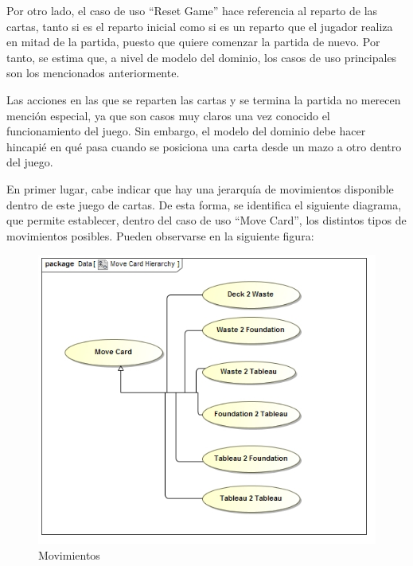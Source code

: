 \documentclass[11pt]{article}
\begin{document}
Por otro lado, el caso de uso ``Reset Game'' hace referencia al reparto de las cartas, tanto si es el reparto inicial como si es un reparto que el jugador realiza en mitad de la partida, puesto que quiere comenzar la partida de nuevo. Por tanto, se estima que, a nivel de modelo del dominio, los casos de uso principales son los mencionados anteriormente.

Las acciones en las que se reparten las cartas y se termina la partida no merecen mención especial, ya que son casos muy claros una vez conocido el funcionamiento del juego. Sin embargo, el modelo del dominio debe hacer hincapié en qué pasa cuando se posiciona una carta desde un mazo a otro dentro del juego.

En primer lugar, cabe indicar que hay una jerarquía de movimientos disponible dentro de este juego de cartas. De esta forma, se identifica el siguiente diagrama, que permite establecer, dentro del caso de uso ``Move Card'', los distintos tipos de movimientos posibles. Pueden observarse en la siguiente figura:

\begin{center}
 \begin{figure}[H]
 \begin{center}
   \includegraphics[width=14cm]{DomainModel/MoveCardHierarchy.jpg}
   \caption{Movimientos}
   \label{fig:movements}
 \end{center}
 \end{figure}
\end{center}
\end{document}
